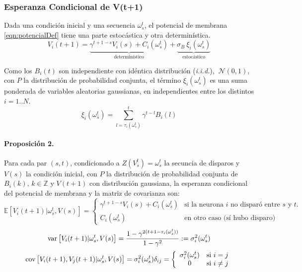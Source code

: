 \subsubsection{Esperanza Condicional de V(t+1)}

Dada una condición inicial y una secuencia $\omega_s^t$, el potencial de membrana \eqref{eqn:potencialDef} tiene una parte estocástica y otra determinística.
\begin{equation}
  V_i(t+1) = \underbrace{\gamma^{t+1-s} V_i(s) + C_i(\omega_s^t)}_{\text{determinístico}} + \underbrace{\sigma_B \  \xi_i(\omega_s^t)}_{\text{estocástico}}
  \label{eqn:potencialCompacto}
\end{equation}

Como los $B_i(t)$ son independiente con idéntica distribución (\emph{i.i.d.}), $~\mathcal{N}(0,1)$, con $P$ la distribución de probabilidad conjunta, el término $ \xi_i(\omega_s^t)$ es una suma ponderada de variables aleatorias gaussianas, en independientes entre los distintos $i=1..N$.
\begin{equation}
\xi_i(\omega_s^t) = \sum_{l=\tau_i(\omega_s^t)}^t \gamma^{t-l} B_i(l)
\label{eqn:xi1}
\end{equation}

\paragraph{Proposición 2.}
Para cada par $(s,t)$, condicionado a $Z(V_s^t)=\omega_s^t$ la secuncia de disparos y $V(s)$ la condición inicial, con $P$ la distribución de probabilidad conjunta de $B_i(k)$, $k \in \mathbb{Z}$ y $V(t+1)$ con distribución gaussiana, la esperanza condicional del potencial de membrana y la matriz de covarianza son:
\begin{equation}
    \mathbb{E}[V_i(t+1)|\omega_s^t, V(s)] = \left\{ \begin{array}{cl}
                        \gamma^{t+1-s} V_i(s) + C_i(\omega_s^t)   & \text{si la neurona $i$ no disparó entre $s$ y $t$.}\\ 
                         C_i(\omega_s^t)    & \text{en otro caso (sí hubo disparo)}
                    \end{array}\right.
    \label{eqn:espCond1}
\end{equation}
\begin{equation}
    \text{var}\left[V_i(t+1)|\omega_s^t, V(s)\right] = \frac{1-\gamma^{2(t+1-\tau_i(\omega_s^t))}}{1-\gamma^2} := \sigma_i^2(\omega_s^t)
\end{equation}
\begin{equation}
    \text{cov}\left[V_i(t+1),V_j(t+1)|\omega_s^t, V(s)\right] = \sigma_i^2(\omega_s^t) \delta_{ij} = \left\{ \begin{array}{cl}
                        \sigma_i^2(\omega_s^t)   & \text{si } i=j\\ 
                         0    & \text{si } i\neq j
                    \end{array}\right.
\end{equation}

